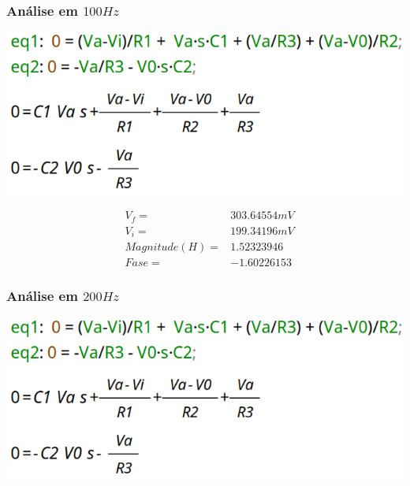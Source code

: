 \documentclass[12pt,twoside, a4paper, twocolumn]{article}
\begin{document}
\subsubsection{Análise em $100Hz$}




\begin{adjustbox}{scale=0.09}
    \includegraphics{eqs.png}
\end{adjustbox}




\begin{equation*}
    \begin{aligned}
         & V_f =          & 303.64554mV \\
         & V_i =          & 199.34196mV \\
         & Magnitude(H) = & 1.52323946  \\
         & Fase =         & -1.60226153
    \end{aligned}
\end{equation*}








\subsubsection{Análise em $200Hz$}




\begin{adjustbox}{scale=0.09}
    \includegraphics{eqs.png}
\end{adjustbox}
\end{document}

